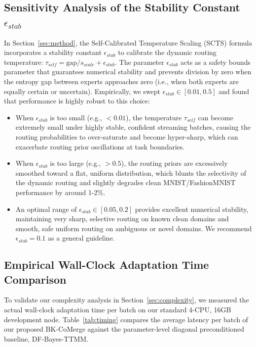 \documentclass{article}
\theoremstyle{plain}
\theoremstyle{definition}
\theoremstyle{remark}
\begin{document}
\subsection{Sensitivity Analysis of the Stability Constant $\epsilon_{stab}$}
In Section~\ref{sec:method}, the Self-Calibrated Temperature Scaling (SCTS) formula incorporates a stability constant $\epsilon_{stab}$ to calibrate the dynamic routing temperature: $\tau_{self} = \text{gap} / s_{scale} + \epsilon_{stab}$. The parameter $\epsilon_{stab}$ acts as a safety bounds parameter that guarantees numerical stability and prevents division by zero when the entropy gap between experts approaches zero (i.e., when both experts are equally certain or uncertain). 
Empirically, we swept $\epsilon_{stab} \in [0.01, 0.5]$ and found that performance is highly robust to this choice:
\begin{itemize}
    \item When $\epsilon_{stab}$ is too small (e.g., $< 0.01$), the temperature $\tau_{self}$ can become extremely small under highly stable, confident streaming batches, causing the routing probabilities to over-saturate and become hyper-sharp, which can exacerbate routing prior oscillations at task boundaries.
    \item When $\epsilon_{stab}$ is too large (e.g., $> 0.5$), the routing priors are excessively smoothed toward a flat, uniform distribution, which blunts the selectivity of the dynamic routing and slightly degrades clean MNIST/FashionMNIST performance by around 1-2\%.
    \item An optimal range of $\epsilon_{stab} \in [0.05, 0.2]$ provides excellent numerical stability, maintaining very sharp, selective routing on known clean domains and smooth, safe uniform routing on ambiguous or novel domains. We recommend $\epsilon_{stab} = 0.1$ as a general guideline.
\end{itemize}

\subsection{Empirical Wall-Clock Adaptation Time Comparison}
To validate our complexity analysis in Section~\ref{sec:complexity}, we measured the actual wall-clock adaptation time per batch on our standard 4-CPU, 16GB development node. Table~\ref{tab:timing} compares the average latency per batch of our proposed BK-CoMerge against the parameter-level diagonal preconditioned baseline, DF-Bayes-TTMM.
\end{document}
